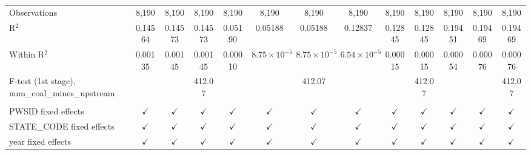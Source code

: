 \begin{table}[htbp]
\begin{adjustbox}{width = \textwidth, center}
\begin{tabular}{lcccccccccccc}
          \\
         
         Observations                                      & 8,190         & 8,190         & 8,190         & 8,190         & 8,190                 & 8,190                 & 8,190                 & 8,190         & 8,190         & 8,190         & 8,190         & 8,190\\  
         R$^2$                                             & 0.14564       & 0.14573       & 0.14573       & 0.05190       & 0.05188               & 0.05188               & 0.12837               & 0.12845       & 0.12845       & 0.19451       & 0.19469       & 0.19469\\  
         Within R$^2$                                      & 0.00135       & 0.00145       & 0.00145       & 0.00010       & $8.75\times 10^{-5}$  & $8.75\times 10^{-5}$  & $6.54\times 10^{-5}$  & 0.00015       & 0.00015       & 0.00054       & 0.00076       & 0.00076\\  
         F-test (1st stage), num\_coal\_mines\_upstream    &               &               & 412.07        &               &                       & 412.07                &                       &               & 412.07        &               &               & 412.07\\  
         
          \\
         
         PWSID fixed effects                               & $\checkmark$  & $\checkmark$  & $\checkmark$  & $\checkmark$  & $\checkmark$          & $\checkmark$          & $\checkmark$          & $\checkmark$  & $\checkmark$  & $\checkmark$  & $\checkmark$  & $\checkmark$\\   
         STATE\_CODE fixed effects                         & $\checkmark$  & $\checkmark$  & $\checkmark$  & $\checkmark$  & $\checkmark$          & $\checkmark$          & $\checkmark$          & $\checkmark$  & $\checkmark$  & $\checkmark$  & $\checkmark$  & $\checkmark$\\   
         year fixed effects                                & $\checkmark$  & $\checkmark$  & $\checkmark$  & $\checkmark$  & $\checkmark$          & $\checkmark$          & $\checkmark$          & $\checkmark$  & $\checkmark$  & $\checkmark$  & $\checkmark$  & $\checkmark$\\   
         
         \bottomrule
         
      \end{tabular}
      

\end{adjustbox}
\end{table}
